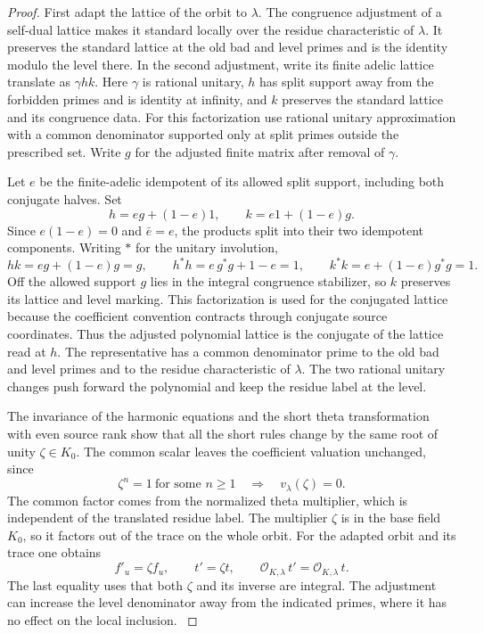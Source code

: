 \begin{proof}
First adapt the lattice of the orbit to \(\lambda\). The
congruence adjustment of a self-dual lattice makes it
standard locally over the residue characteristic of
\(\lambda\). It preserves the standard lattice at the
old bad and level primes and is the identity modulo the
level there. In the second adjustment, write its finite
adelic lattice translate as \(\gamma h k\). Here \(\gamma\)
is rational unitary, \(h\) has split support away from
the forbidden primes and is identity at infinity, and
\(k\) preserves the standard lattice and its congruence
data. For this factorization use rational unitary
approximation with a common denominator supported
only at split primes outside the prescribed set.
Write \(g\) for the adjusted finite matrix after removal
of \(\gamma\).

Let \(e\) be the finite-adelic idempotent of
its allowed split support, including both conjugate halves.
Set
\[
 h=eg+(1-e)1,\qquad k=e1+(1-e)g.
\]
Since \(e(1-e)=0\) and \(\bar e=e\), the products split into
their two idempotent components. Writing \(*\) for the unitary involution,
\[
 hk=eg+(1-e)g=g,\qquad
 h^*h=e\,g^*g+1-e=1,\qquad k^*k=e+(1-e)g^*g=1.
\] Off the allowed support \(g\) lies in the integral
congruence stabilizer, so \(k\) preserves its lattice and
level marking.
This factorization is used for the conjugated
lattice because the coefficient convention contracts
through conjugate source coordinates. Thus the adjusted
polynomial lattice is the conjugate of the lattice read
at \(h\). The representative has a common denominator
prime to the old bad and level primes and to the residue
characteristic of \(\lambda\). The two rational unitary
changes push forward the polynomial and keep the residue
label at the level.

The invariance of the harmonic
equations and the short theta transformation with even
source rank show that all the short rules change by the
same root of unity \(\zeta\in K_0\).
The common scalar leaves the coefficient valuation unchanged, since
\[
  \zeta^n=1\ \text{for some }n\ge1\quad\Longrightarrow\quad v_\lambda(\zeta)=0.
\]
 The common factor
comes from the normalized theta multiplier, which is
independent of the translated residue label. The multiplier \(\zeta\) is in the base field \(K_0\), so it factors out of the trace on the whole orbit. For the adapted orbit and its trace one obtains
\[
        f'_u=\zeta f_u,\qquad t'=\zeta t,\qquad
        \mathcal O_{K,\lambda}\,t'=\mathcal O_{K,\lambda}\,t .
\]
The last equality uses that both \(\zeta\) and its inverse are integral. The adjustment can
increase the level denominator away from the indicated
primes, where it has no effect on the local inclusion.
\label{cor:paired-off-prime-trace-2}


\end{proof}
